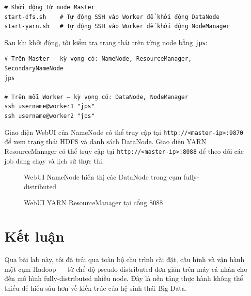 \documentclass[12pt,a4paper]{article}
\begin{document}
\begin{verbatim}
# Khởi động từ node Master
start-dfs.sh    # Tự động SSH vào Worker để khởi động DataNode
start-yarn.sh   # Tự động SSH vào Worker để khởi động NodeManager
\end{verbatim}

Sau khi khởi động, tôi kiểm tra trạng thái trên từng node bằng \texttt{jps}:

\begin{verbatim}
# Trên Master — kỳ vọng có: NameNode, ResourceManager, SecondaryNameNode
jps

# Trên mỗi Worker — kỳ vọng có: DataNode, NodeManager
ssh username@worker1 "jps"
ssh username@worker2 "jps"
\end{verbatim}

Giao diện WebUI của NameNode có thể truy cập tại
\texttt{http://<master-ip>:9870} để xem trạng thái HDFS và danh sách DataNode. Giao
diện YARN ResourceManager có thể truy cập tại
\texttt{http://<master-ip>:8088} để theo dõi các job đang chạy và lịch sử thực thi.

\begin{figure}[H]
  \centering
  \caption{WebUI NameNode hiển thị các DataNode trong cụm fully-distributed}
  \label{fig:webui-cluster}
\end{figure}

\begin{figure}[H]
  \centering
  \caption{WebUI YARN ResourceManager tại cổng 8088}
  \label{fig:webui-yarn}
\end{figure}

\section{Kết luận}

Qua bài lab này, tôi đã trải qua toàn bộ chu trình cài đặt, cấu hình và vận hành
một cụm Hadoop — từ chế độ pseudo-distributed đơn giản trên máy cá nhân cho đến
mô hình fully-distributed nhiều node. Đây là nền tảng thực hành không thể thiếu
để hiểu sâu hơn về kiến trúc của hệ sinh thái Big Data.
\end{document}
